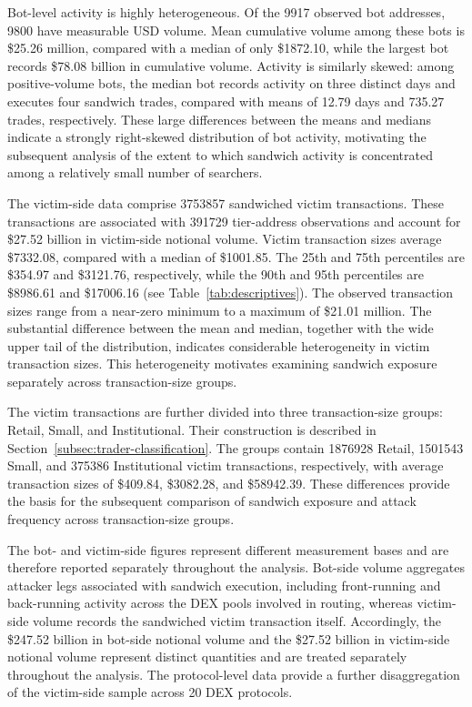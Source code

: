 \documentclass[pdflatex, sn-basic]{sn-jnl}
\theoremstyle{thmstylethree}%
\begin{document}
    Bot-level activity is highly heterogeneous.
    Of the \num{9917} observed bot addresses, \num{9800} have measurable USD volume.
    Mean cumulative volume among these bots is \$\num{25.26} million, compared with a median of only \$\num{1872.10}, while the largest bot records \$\num{78.08} billion in cumulative volume.
    Activity is similarly skewed: among positive-volume bots, the median bot records activity on three distinct days and executes four sandwich trades, compared with means of \num{12.79} days and \num{735.27} trades, respectively.
    These large differences between the means and medians indicate a strongly right-skewed distribution of bot activity, motivating the subsequent analysis of the extent to which sandwich activity is concentrated among a relatively small number of searchers.
    
    The victim-side data comprise \num{3753857} sandwiched victim transactions.
    These transactions are associated with \num{391729} tier-address observations and account for \$\num{27.52} billion in victim-side notional volume.
    Victim transaction sizes average \$\num{7332.08}, compared with a median of \$\num{1001.85}.
    The 25th and 75th percentiles are \$\num{354.97} and \$\num{3121.76}, respectively, while the 90th and 95th percentiles are \$\num{8986.61} and \$\num{17006.16} (see Table~\ref{tab:descriptives}).
    The observed transaction sizes range from a near-zero minimum to a maximum of \$\num{21.01} million.
    The substantial difference between the mean and median, together with the wide upper tail of the distribution, indicates considerable heterogeneity in victim transaction sizes. This heterogeneity motivates examining sandwich exposure separately across transaction-size groups.
    
    The victim transactions are further divided into three transaction-size groups: Retail, Small, and Institutional.
    Their construction is described in Section~\ref{subsec:trader-classification}.
    The groups contain \num{1876928} Retail, \num{1501543} Small, and \num{375386} Institutional victim transactions, respectively, with average transaction sizes of \$\num{409.84}, \$\num{3082.28}, and \$\num{58942.39}.
    These differences provide the basis for the subsequent comparison of sandwich exposure and attack frequency across transaction-size groups.
	
	
    
    The bot- and victim-side figures represent different measurement bases and are therefore reported separately throughout the analysis.
    Bot-side volume aggregates attacker legs associated with sandwich execution, including front-running and back-running activity across the DEX pools involved in routing, whereas victim-side volume records the sandwiched victim transaction itself.
    Accordingly, the \$\num{247.52} billion in bot-side notional volume and the \$\num{27.52} billion in victim-side notional volume represent distinct quantities and are treated separately throughout the analysis.
    The protocol-level data provide a further disaggregation of the victim-side sample across \num{20} DEX protocols.
    
\end{document}

